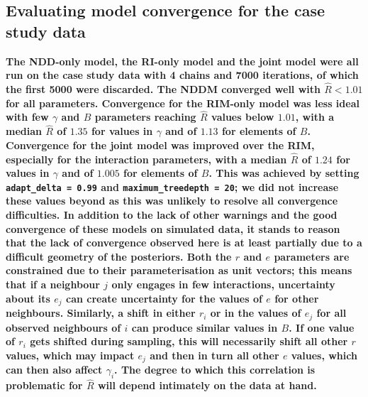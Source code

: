 \begin{refsection}
    \subsection{Evaluating model convergence for the case study data}
    \label{SI:convergence}


    \textbf{The NDD-only model, the RI-only model and the joint model were all run on the case study data with 4 chains and 7000 iterations, of which the first 5000 were discarded. The NDDM converged well with $\hat{R} < 1.01$ for all parameters. Convergence for the RIM-only model was less ideal with few $\gamma$ and $B$ parameters reaching  $\hat{R}$ values below $1.01$, with a median $\hat{R}$ of $1.35$ for values in $\gamma$ and of $1.13$ for elements of $B$. Convergence for the joint model was improved over the RIM, especially for the interaction parameters, with a median $\hat{R}$ of $1.24$ for  values in $\gamma$ and of $1.005$ for elements of $B$. This was achieved by setting \texttt{adapt\_delta = 0.99} and \texttt{maximum\_treedepth = 20}; we did not increase these values beyond as this was unlikely to resolve all convergence difficulties. In addition to the lack of other warnings and the good convergence of these models on simulated data, it stands to reason that the lack of convergence observed here is at least partially due to a difficult geometry of the posteriors. Both the $r$ and $e$ parameters are constrained due to their parameterisation as unit vectors; this means that if a neighbour $j$ only engages in few interactions, uncertainty about its $e_j$ can create uncertainty for the values of $e$ for other neighbours. Similarly, a shift in either $r_i$ or in the values of $e_j$ for all observed neighbours of $i$ can produce similar values in $B$. If one value of $r_i$ gets shifted during sampling, this will necessarily shift all other $r$ values, which may impact $e_j$ and then in turn all other $e$ values, which can then also affect $\gamma_i$. The degree to which this correlation is problematic for $\hat{R}$ will depend intimately on the data at hand.} 


\end{refsection}
